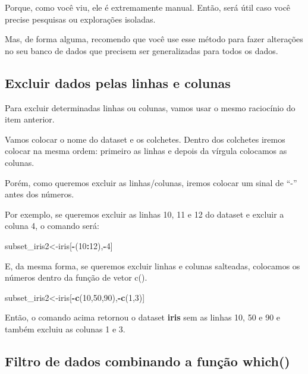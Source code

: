 \documentclass[
]{book}
\newenvironment{Shaded}{\begin{snugshade}}{\end{snugshade}}
\newcommand{\DecValTok}[1]{\textcolor[rgb]{0.00,0.00,0.81}{#1}}
\newcommand{\KeywordTok}[1]{\textcolor[rgb]{0.13,0.29,0.53}{\textbf{#1}}}
\newcommand{\NormalTok}[1]{#1}
\newcommand{\OperatorTok}[1]{\textcolor[rgb]{0.81,0.36,0.00}{\textbf{#1}}}
\begin{document}
Porque, como você viu, ele é extremamente manual. Então, será útil caso
você precise pesquisas ou explorações isoladas.

Mas, de forma alguma, recomendo que você use esse método para fazer
alterações no seu banco de dados que precisem ser generalizadas para
todos os dados.

\hypertarget{excluir-dados-pelas-linhas-e-colunas}{%
\subsection{Excluir dados pelas linhas e
colunas}\label{excluir-dados-pelas-linhas-e-colunas}}

Para excluir determinadas linhas ou colunas, vamos usar o mesmo
raciocínio do item anterior.

Vamos colocar o nome do dataset e os colchetes. Dentro dos colchetes
iremos colocar na mesma ordem: primeiro as linhas e depois da vírgula
colocamos as colunas.

Porém, como queremos excluir as linhas/colunas, iremos colocar um sinal
de ``-'' antes dos números.

Por exemplo, se queremos excluir as linhas 10, 11 e 12 do dataset e
excluir a coluna 4, o comando será:

\begin{Shaded}
\begin{Highlighting}[]
\NormalTok{subset_iris2<-iris[}\OperatorTok{-}\NormalTok{(}\DecValTok{10}\OperatorTok{:}\DecValTok{12}\NormalTok{),}\OperatorTok{-}\DecValTok{4}\NormalTok{]}
\end{Highlighting}
\end{Shaded}

E, da mesma forma, se queremos excluir linhas e colunas salteadas,
colocamos os números dentro da função de vetor c().

\begin{Shaded}
\begin{Highlighting}[]
\NormalTok{subset_iris2<-iris[}\OperatorTok{-}\KeywordTok{c}\NormalTok{(}\DecValTok{10}\NormalTok{,}\DecValTok{50}\NormalTok{,}\DecValTok{90}\NormalTok{),}\OperatorTok{-}\KeywordTok{c}\NormalTok{(}\DecValTok{1}\NormalTok{,}\DecValTok{3}\NormalTok{)]}
\end{Highlighting}
\end{Shaded}

Então, o comando acima retornou o dataset \textbf{iris} sem as linhas
10, 50 e 90 e também excluiu as colunas 1 e 3.

\hypertarget{filtro-de-dados-combinando-a-funuxe7uxe3o-which}{%
\subsection{Filtro de dados combinando a função
which()}\label{filtro-de-dados-combinando-a-funuxe7uxe3o-which}}
\end{document}
